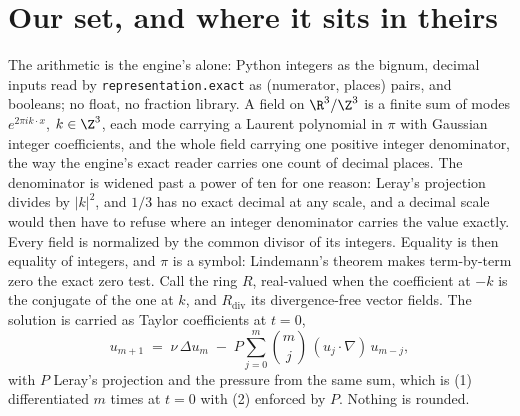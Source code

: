 \section{Our set, and where it sits in theirs}

The arithmetic is the engine's alone: Python integers as the bignum, decimal inputs read by
\texttt{representation.exact} as (numerator, places) pairs, and booleans; no float, no fraction
library. A field on $\R^3/\Z^3$ is a finite sum of modes $e^{2\pi i k\cdot x}$, $k\in\Z^3$, each mode
carrying a Laurent polynomial in $\pi$ with Gaussian integer coefficients, and the whole field
carrying one positive integer denominator, the way the engine's exact reader carries one count of
decimal places. The denominator is widened past a power of ten for one reason: Leray's projection
divides by $|k|^2$, and $1/3$ has no exact decimal at any scale, and a decimal scale would then have
to refuse where an integer denominator carries the value exactly. Every field is normalized by the
common divisor of its integers. Equality is then equality of integers, and $\pi$ is a symbol:
Lindemann's theorem makes term-by-term zero the exact zero test. Call the ring $R$, real-valued when
the coefficient at $-k$ is the conjugate of the one at $k$, and $R_{\mathrm{div}}$ its
divergence-free vector fields. The solution is carried as Taylor coefficients at $t=0$,
\[
u_{m+1} \;=\; \nu\,\Delta u_m \;-\; P\sum_{j=0}^{m}\binom{m}{j}\,(u_j\cdot\nabla)\,u_{m-j},
\]
with $P$ Leray's projection and the pressure from the same sum, which is (1) differentiated $m$ times
at $t=0$ with (2) enforced by $P$. Nothing is rounded.

